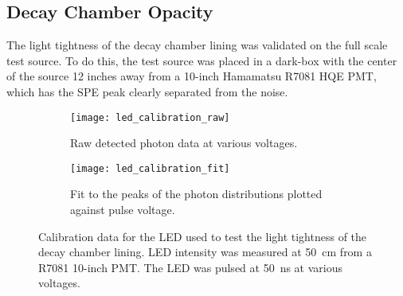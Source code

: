 \subsection{Decay Chamber Opacity}
\label{sec:liningtest}
The light tightness of the decay chamber lining was validated on the full scale test source. 
To do this, the test source was placed in a dark-box with the center of the source 12 inches away from a 10-inch Hamamatsu R7081 HQE PMT, which has the SPE peak clearly separated from the noise. 
\begin{figure}
\begin{subfigure}[t]{0.48\textwidth}
\texttt{[image: led\_calibration\_raw]}
\caption{Raw detected photon data at various voltages.}
\label{fig:ledRAW}
\end{subfigure}
\hfill
\begin{subfigure}[t]{0.48\textwidth}
\texttt{[image: led\_calibration\_fit]}
\caption{Fit to the peaks of the photon distributions plotted against pulse voltage.}
\label{fig:ledFit}
\end{subfigure}
\caption{Calibration data for the LED used to test the light tightness of the decay chamber lining. LED intensity was measured at 50~cm from a R7081 10-inch PMT. The LED was pulsed at 50~ns at various voltages.}
\label{fig:calibratedled1}
\end{figure}

